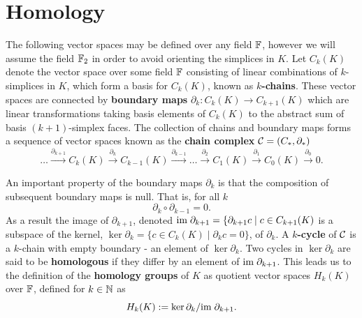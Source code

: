 \section{Homology} %
\label{sec:homology}

%

The following vector spaces may be defined over any field $\mathbb{F}$, however we will assume the field $\mathbb{F}_2$ in order to avoid orienting the simplices in $K$.
Let $C_k(K)$ denote the vector space over some field $\mathbb{F}$ consisting of linear combinations of $k$-simplices in $K$, which form a basis for $C_k(K)$, known as \textbf{$k$-chains}.
These vector spaces are connected by \textbf{boundary maps} $\partial_k:C_k(K)\to C_{k+1}(K)$ which are linear transformations taking basis elements of $C_k(K)$ to the abstract sum of basis $(k+1)$-simplex faces.
The collection of chains and boundary maps forms a sequence of vector spaces known as the \textbf{chain complex} $\mathcal{C} = (C_*,\partial_*)$
\[
    \ldots\xrightarrow{\partial_{k+1}}
    C_k(K)\xrightarrow{\partial_{k}}
    C_{k-1}(K)\xrightarrow{\partial_{k-1}}
    \ldots\xrightarrow{\partial_2}
    C_1(K)\xrightarrow{\partial_{1}}
    C_0(K)\xrightarrow{\partial_0} 0.
\]

An important property of the boundary maps $\partial_k$ is that the composition of subsequent boundary maps is null.
That is, for all $k$
\[ \partial_k\circ\partial_{k-1} = 0. \]
As a result the image of $\partial_{k+1}$, denoted $\mathrm{im}\;\partial_{k+1} = \{\partial_{k+1}c\mid c\in C_{k+1}(K)$ is a subspace of the kernel, $\ker\partial_k = \{c\in C_k(K)\mid \partial_k c = 0\}$, of $\partial_k$.
A \textbf{$k$-cycle} of $\mathcal{C}$ is a $k$-chain with empty boundary - an element of $\ker\partial_k$.
Two cycles in $\ker\partial_k$ are said to be \textbf{homologous} if they differ by an element of $\mathrm{im}\;\partial_{k+1}$.
This leads us to the definition of the \textbf{homology groups} of $K$ as quotient vector spaces $H_k(K)$ over $\mathbb{F}$, defined for $k\in\mathbb{N}$ as
\[ H_k(K) := \ker\partial_k/\mathrm{im}\;\partial_{k+1}.\]

